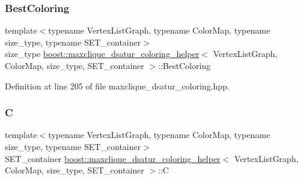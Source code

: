 \mbox{\label{classboost_1_1maxclique__dsatur__coloring__helper_ae8121f8ea3161423af724312f444ffc4}} 
\subsubsection{\texorpdfstring{Best\+Coloring}{BestColoring}}
{\footnotesize\ttfamily template$<$typename Vertex\+List\+Graph, typename Color\+Map, typename size\+\_\+type, typename S\+E\+T\+\_\+container$>$ \\
size\+\_\+type \hyperlink{classboost_1_1maxclique__dsatur__coloring__helper}{boost\+::maxclique\+\_\+dsatur\+\_\+coloring\+\_\+helper}$<$ Vertex\+List\+Graph, Color\+Map, size\+\_\+type, S\+E\+T\+\_\+container $>$\+::Best\+Coloring\hspace{0.3cm}{\ttfamily [private]}}



Definition at line 205 of file maxclique\+\_\+dsatur\+\_\+coloring.\+hpp.

\mbox{\label{classboost_1_1maxclique__dsatur__coloring__helper_a251992998e0a300e73e674d0ae0fb9cd}} 
\subsubsection{\texorpdfstring{C}{C}}
{\footnotesize\ttfamily template$<$typename Vertex\+List\+Graph, typename Color\+Map, typename size\+\_\+type, typename S\+E\+T\+\_\+container$>$ \\
S\+E\+T\+\_\+container \hyperlink{classboost_1_1maxclique__dsatur__coloring__helper}{boost\+::maxclique\+\_\+dsatur\+\_\+coloring\+\_\+helper}$<$ Vertex\+List\+Graph, Color\+Map, size\+\_\+type, S\+E\+T\+\_\+container $>$\+::C\hspace{0.3cm}{\ttfamily [private]}}



